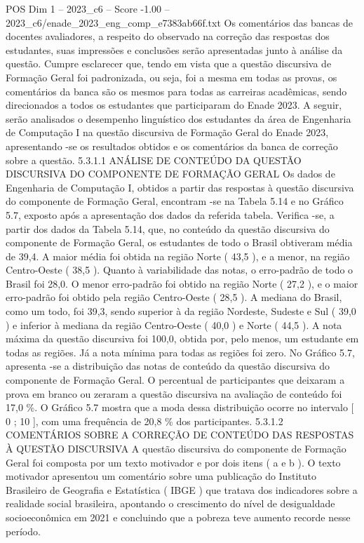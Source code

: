 \begin{textsample}{POS Dim 1 – 2023\_c6 – Score -1.00 – 2023\_c6/enade\_2023\_eng\_comp\_e7383ab66f.txt}
Os comentários das bancas de docentes avaliadores, a respeito do observado na correção das respostas dos estudantes, suas impressões e conclusões serão apresentadas junto à análise da questão.
Cumpre esclarecer que, tendo em vista que a questão discursiva de Formação Geral foi padronizada, ou seja, foi a mesma em todas as provas, os comentários da banca são os mesmos para todas as carreiras acadêmicas, sendo direcionados a todos os estudantes que participaram do Enade 2023.
A seguir, serão analisados o desempenho linguístico dos estudantes da área de Engenharia de Computação I na questão discursiva de Formação Geral do Enade 2023, apresentando -se os resultados obtidos e os comentários da banca de correção sobre a questão. 5.3.1.1 ANÁLISE DE CONTEÚDO DA QUESTÃO DISCURSIVA DO COMPONENTE DE FORMAÇÃO GERAL Os dados de Engenharia de Computação I, obtidos a partir das respostas à questão discursiva do componente de Formação Geral, encontram -se na Tabela 5.14 e no Gráfico 5.7, exposto após a apresentação dos dados da referida tabela.
Verifica -se, a partir dos dados da Tabela 5.14, que, no conteúdo da questão discursiva do componente de Formação Geral, os estudantes de todo o Brasil obtiveram média de 39,4.
A maior média foi obtida na região Norte ( 43,5 ), e a menor, na região Centro-Oeste ( 38,5 ).
Quanto à variabilidade das notas, o erro-padrão de todo o Brasil foi 28,0.
O menor erro-padrão foi obtido na região Norte ( 27,2 ), e o maior erro-padrão foi obtido pela região Centro-Oeste ( 28,5 ).
A mediana do Brasil, como um todo, foi 39,3, sendo superior à da região Nordeste, Sudeste e Sul ( 39,0 ) e inferior à mediana da região Centro-Oeste ( 40,0 ) e Norte ( 44,5 ).
A nota máxima da questão discursiva foi 100,0, obtida por, pelo menos, um estudante em todas as regiões.
Já a nota mínima para todas as regiões foi zero.
No Gráfico 5.7, apresenta -se a distribuição das notas de conteúdo da questão discursiva do componente de Formação Geral.
O percentual de participantes que deixaram a prova em branco ou zeraram a questão discursiva na avaliação de conteúdo foi 17,0 \%.
O Gráfico 5.7 mostra que a moda dessa distribuição ocorre no intervalo [ 0 ; 10 ], com uma frequência de 20,8 \% dos participantes. 5.3.1.2 COMENTÁRIOS SOBRE A CORREÇÃO DE CONTEÚDO DAS RESPOSTAS À QUESTÃO DISCURSIVA A questão discursiva do componente de Formação Geral foi composta por um texto motivador e por dois itens ( a e b ).
O texto motivador apresentou um comentário sobre uma publicação do Instituto Brasileiro de Geografia e Estatística ( IBGE ) que tratava dos indicadores sobre a realidade social brasileira, apontando o crescimento do nível de desigualdade socioeconômica em 2021 e concluindo que a pobreza teve aumento recorde nesse período.

\end{textsample}
